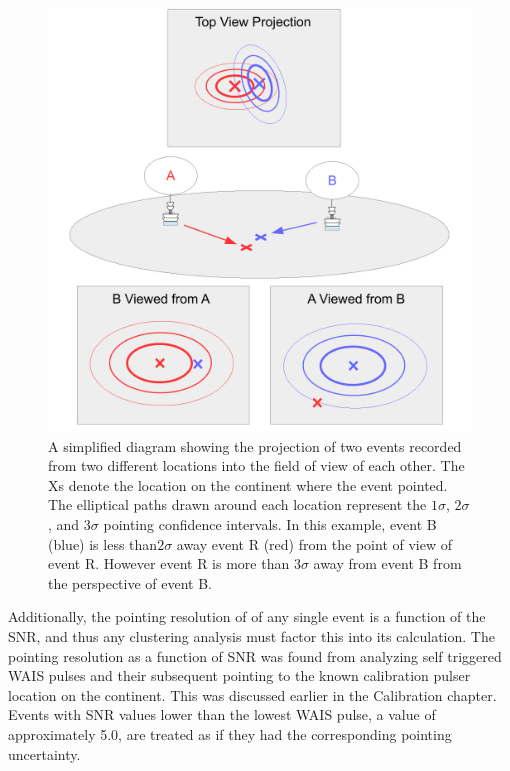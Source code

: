 \begin{figure}
	\centering
	\includegraphics[width=\textwidth]{figures/clusteringProjection}
	\caption{A simplified diagram showing the projection of two events recorded from two different locations into the field of view of each other.  The Xs denote the location on the continent where the event pointed.  The elliptical paths drawn around each location represent the $1\sigma$, $2\sigma$, and $3\sigma$ pointing confidence intervals.  In this example, event B (blue) is less than$2\sigma$ away event R (red) from the point of view of event R.  However event R is more than $3\sigma$ away from event B from the perspective of event B.} 
	\label{fig:clusteringProjection}
\end{figure}
		
		Additionally, the pointing resolution of of any single event is a function of the SNR, and thus any clustering analysis must factor this into its calculation.  The pointing resolution as a function of SNR was found from analyzing self triggered WAIS pulses and their subsequent pointing to the known calibration pulser location on the continent.  This was discussed earlier in the Calibration chapter.  Events with SNR values lower than the lowest WAIS pulse, a value of approximately 5.0, are treated as if they had the corresponding pointing uncertainty.
		
